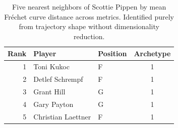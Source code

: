 \begin{table}[htbp]
  \centering\small
  \begin{tabular}{rllc}
    \toprule
    Rank & Player & Position & Archetype \\
    \midrule
    1 & Toni Kukoc & F & 1 \\
    2 & Detlef Schrempf & F & 1 \\
    3 & Grant Hill & G & 1 \\
    4 & Gary Payton & G & 1 \\
    5 & Christian Laettner & F & 1 \\
    \bottomrule
  \end{tabular}
  \caption{Five nearest neighbors of Scottie Pippen by mean Fr\'{e}chet curve distance across metrics. Identified purely from trajectory shape without dimensionality reduction.}
  \label{tab:Scottie_Pippen_frechet_curve_neighbors}
\end{table}

